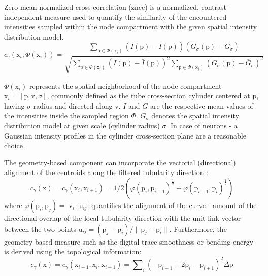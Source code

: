 Zero-mean normalized cross-correlation (\gls{zncc}) is a normalized, contrast-independent measure used to quantify the similarity of the encountered intensities sampled within the node compartment with the given spatial intensity distribution model.
\begin{equation}
c_{\gamma}(\mathrm{x}_i, \Phi(\mathrm{x}_i)) = \frac{ \sum\limits_{\mathrm{p} \in \Phi(\mathrm{x}_i)} (I(\mathrm{p}) - \bar{I}(\mathrm{p}))(G_{\sigma}(\mathrm{p}) - \bar{G}_{\sigma}) }{ \sqrt{ \sum\limits_{\mathrm{p} \in \Phi(\mathrm{x}_i)}(I(\mathrm{p}) - \bar{I}(\mathrm{p}))^2 \sum\limits_{\mathrm{p} \in \Phi(\mathrm{x}_i)}(G_{\sigma}(\mathrm{p}) - \bar{G}_{\sigma})^2 } }
\label{ch1_eq1}
\end{equation}

$\Phi(\mathrm{x}_i)$ represents the spatial neighborhood of the node compartment $\mathrm{x}_i = [ \mathrm{p}, \mathrm{v}, \sigma ]$, commonly defined as the tube cross-section cylinder centered at $\mathrm{p}$, having $\sigma$ radius and directed along $\mathrm{v}$. $\bar{I}$ and $\bar{G}$ are the respective mean values of the intensities inside the sampled region $\Phi$. $G_{\sigma}$ denotes the spatial intensity distribution model at given scale (cylinder radius) $\sigma$. In case of neurons - a Gaussian intensity profiles in the cylinder cross-section plane are a reasonable choice \cite{radojevic2017neuron}. 

The geometry-based component can incorporate the vectorial (directional) alignment of the centroids along the filtered tubularity direction \cite{meijering2004design}:  
\begin{equation}
c_{\gamma}(\mathrm{x}) = c_{\gamma}(\mathrm{x}_{i}, \mathrm{x}_{i+1}) = 1/2 \left( \varphi(\mathrm{p}_i, \mathrm{p}_{i+1})^{\frac{1}{2}} + \varphi(\mathrm{p}_{i+1}, \mathrm{p}_{i})^{\frac{1}{2}} \right) 
\end{equation}
where $\varphi( \mathrm{p}_{i}, \mathrm{p}_{j} ) = | \mathrm{v}_i \cdot \mathrm{u}_{ij} |  $ quantifies the alignment of the curve - amount of the directional overlap of the local tubularity direction with the unit link vector between the two points $\mathrm{u}_{ij} = (\mathrm{p}_j - \mathrm{p}_i) / \lVert \mathrm{p}_j - \mathrm{p}_i \rVert $. Furthermore, the geometry-based measure such as the digital trace smoothness \cite{peng2010automatic} or bending energy \cite{radojevic2015fuzzy} is derived using the topological information:
\begin{equation}
c_{\gamma}(\mathrm{x}) = c_{\gamma}(\mathrm{x}_{i-1}, \mathrm{x}_{i}, \mathrm{x}_{i+1}) = \sum\nolimits_{i} (- \mathrm{p}_{i-1} + 2\mathrm{p}_i - \mathrm{p}_{i+1})^2 \Delta\mathrm{p}
\end{equation}

